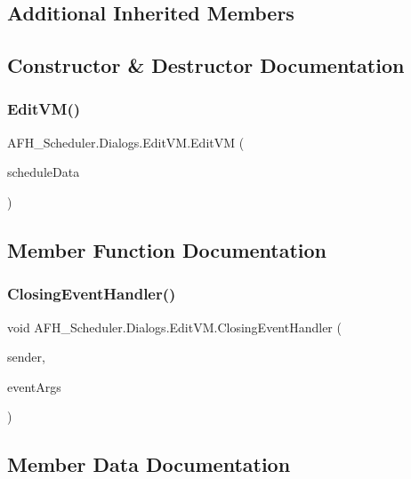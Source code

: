 \subsection*{Additional Inherited Members}


\subsection{Constructor \& Destructor Documentation}
\mbox{\label{class_a_f_h___scheduler_1_1_dialogs_1_1_edit_v_m_ae171b4eeff0564fc33a2fb10ea67016b}} 
\subsubsection{EditVM()}
{\footnotesize\ttfamily A\+F\+H\+\_\+\+Scheduler.\+Dialogs.\+Edit\+V\+M.\+Edit\+VM (\begin{DoxyParamCaption}\item[{\textbf{ Home\+Model}}]{schedule\+Data }\end{DoxyParamCaption})}



\subsection{Member Function Documentation}
\mbox{\label{class_a_f_h___scheduler_1_1_dialogs_1_1_edit_v_m_ac834370aabf24b40266982fd52452f31}} 
\subsubsection{ClosingEventHandler()}
{\footnotesize\ttfamily void A\+F\+H\+\_\+\+Scheduler.\+Dialogs.\+Edit\+V\+M.\+Closing\+Event\+Handler (\begin{DoxyParamCaption}\item[{object}]{sender,  }\item[{Dialog\+Closing\+Event\+Args}]{event\+Args }\end{DoxyParamCaption})}



\subsection{Member Data Documentation}
\mbox{\label{class_a_f_h___scheduler_1_1_dialogs_1_1_edit_v_m_a41fd6105d3a0c08a205ff1546def7cae}} 
